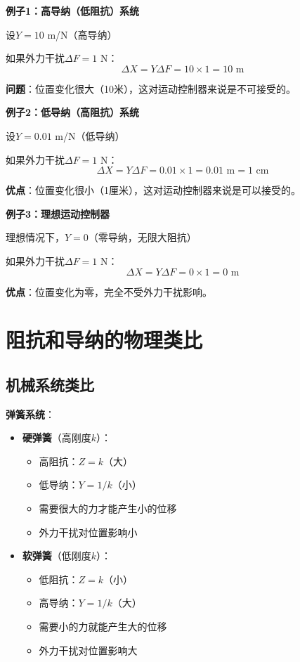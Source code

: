 \documentclass[12pt,a4paper]{article}
\begin{document}
\textbf{例子1：高导纳（低阻抗）系统}

设$Y = 10$ m/N（高导纳）

如果外力干扰$\Delta F = 1$ N：
\begin{equation}
\Delta X = Y \Delta F = 10 \times 1 = 10 \text{ m}
\end{equation}

\textbf{问题}：位置变化很大（10米），这对运动控制器来说是不可接受的。

\textbf{例子2：低导纳（高阻抗）系统}

设$Y = 0.01$ m/N（低导纳）

如果外力干扰$\Delta F = 1$ N：
\begin{equation}
\Delta X = Y \Delta F = 0.01 \times 1 = 0.01 \text{ m} = 1 \text{ cm}
\end{equation}

\textbf{优点}：位置变化很小（1厘米），这对运动控制器来说是可以接受的。

\textbf{例子3：理想运动控制器}

理想情况下，$Y = 0$（零导纳，无限大阻抗）

如果外力干扰$\Delta F = 1$ N：
\begin{equation}
\Delta X = Y \Delta F = 0 \times 1 = 0 \text{ m}
\end{equation}

\textbf{优点}：位置变化为零，完全不受外力干扰影响。

\section{阻抗和导纳的物理类比}

\subsection{机械系统类比}

\textbf{弹簧系统}：
\begin{itemize}
\item \textbf{硬弹簧}（高刚度$k$）：
\begin{itemize}
\item 高阻抗：$Z = k$（大）
\item 低导纳：$Y = 1/k$（小）
\item 需要很大的力才能产生小的位移
\item 外力干扰对位置影响小
\end{itemize}

\item \textbf{软弹簧}（低刚度$k$）：
\begin{itemize}
\item 低阻抗：$Z = k$（小）
\item 高导纳：$Y = 1/k$（大）
\item 需要小的力就能产生大的位移
\item 外力干扰对位置影响大
\end{itemize}
\end{itemize}
\end{document}
